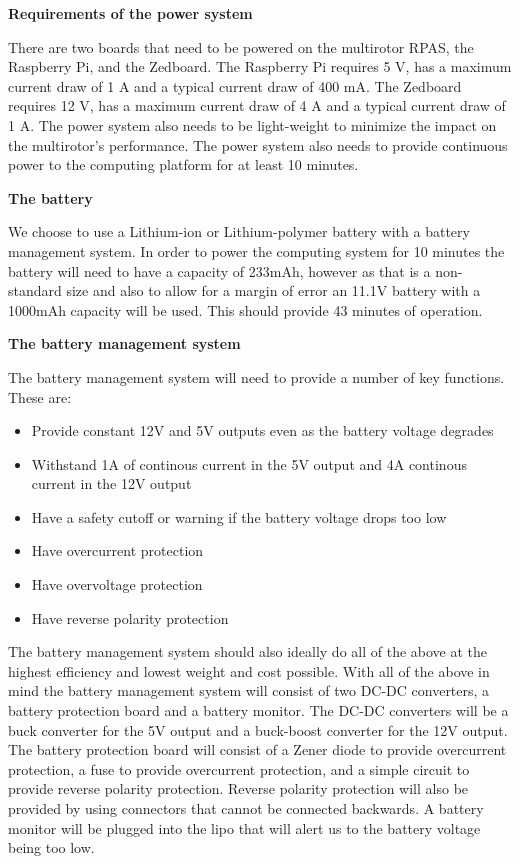 \textbf{Requirements of the power system}

 There are two boards that need to be powered on the multirotor RPAS, the Raspberry Pi, and the Zedboard. The Raspberry Pi requires
5 V, has a maximum current draw of 1 A and a typical current draw of 400 mA. The Zedboard requires 12 V, has a maximum current draw of
4 A and a typical current draw of 1 A. The power system also
needs to be light-weight to minimize the impact on the multirotor's performance. The power system also needs to provide continuous power to the computing platform for at least 10 minutes.

\textbf{The battery}

We choose to use a Lithium-ion or Lithium-polymer battery with a battery management system. In order to
power the computing system for 10 minutes the battery will need to have a capacity of 233mAh, however as that is a non-standard size and also to allow for a margin of error an 11.1V battery with a 1000mAh capacity will be used. This should provide 43 minutes of operation.

\textbf{The battery management system}

The battery management system will need to provide a number of key functions. These are:
  
  \begin{itemize}
\item Provide constant 12V and 5V outputs even as the battery voltage degrades
\item Withstand 1A of continous current in the 5V output and 4A continous current in the 12V output
\item Have a safety cutoff or warning if the battery voltage drops too low
\item Have overcurrent protection
\item Have overvoltage protection
\item Have reverse polarity protection
\end{itemize}
 
The battery management system should also ideally do all of the above at the highest efficiency and lowest weight and cost possible. With all of the above in mind the battery management system will consist of two DC-DC converters, a battery protection board and a battery monitor. The DC-DC converters will be a buck converter for the 5V output and a buck-boost converter for the 12V output. The battery protection board will consist of a Zener diode to provide overcurrent protection, a fuse to provide overcurrent protection, and a simple circuit to provide reverse polarity protection. Reverse polarity protection will also be provided by using connectors that cannot be connected backwards. A battery monitor will be plugged into the lipo that will alert us to the battery voltage being too low.

